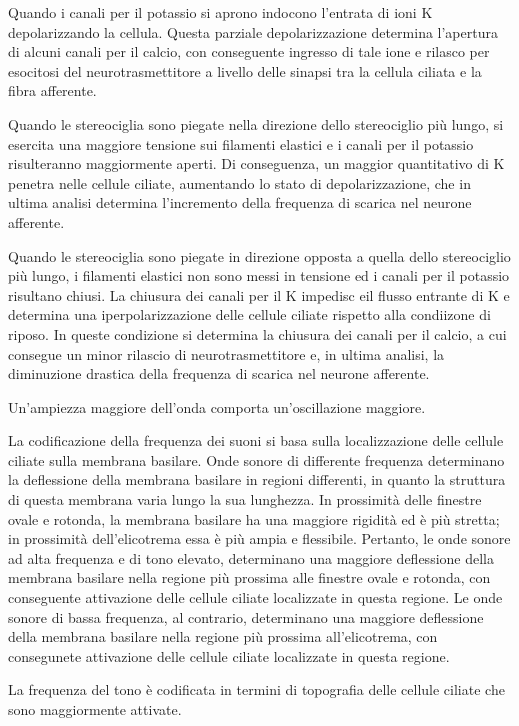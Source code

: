 \documentclass[]{article}
\begin{document}
Quando i canali per il potassio si aprono indocono l'entrata di ioni K
depolarizzando la cellula. Questa parziale depolarizzazione determina
l'apertura di alcuni canali per il calcio, con conseguente ingresso di
tale ione e rilasco per esocitosi del neurotrasmettitore a livello delle
sinapsi tra la cellula ciliata e la fibra afferente.

Quando le stereociglia sono piegate nella direzione dello stereociglio
più lungo, si esercita una maggiore tensione sui filamenti elastici e i
canali per il potassio risulteranno maggiormente aperti. Di conseguenza,
un maggior quantitativo di K penetra nelle cellule ciliate, aumentando
lo stato di depolarizzazione, che in ultima analisi determina
l'incremento della frequenza di scarica nel neurone afferente.

Quando le stereociglia sono piegate in direzione opposta a quella dello
stereociglio più lungo, i filamenti elastici non sono messi in tensione
ed i canali per il potassio risultano chiusi. La chiusura dei canali per
il K impedisc eil flusso entrante di K e determina una
iperpolarizzazione delle cellule ciliate rispetto alla condiizone di
riposo. In queste condizione si determina la chiusura dei canali per il
calcio, a cui consegue un minor rilascio di neurotrasmettitore e, in
ultima analisi, la diminuzione drastica della frequenza di scarica nel
neurone afferente.

Un'ampiezza maggiore dell'onda comporta un'oscillazione maggiore.

La codificazione della frequenza dei suoni si basa sulla localizzazione
delle cellule ciliate sulla membrana basilare. Onde sonore di differente
frequenza determinano la deflessione della membrana basilare in regioni
differenti, in quanto la struttura di questa membrana varia lungo la sua
lunghezza. In prossimità delle finestre ovale e rotonda, la membrana
basilare ha una maggiore rigidità ed è più stretta; in prossimità
dell'elicotrema essa è più ampia e flessibile. Pertanto, le onde sonore
ad alta frequenza e di tono elevato, determinano una maggiore
deflessione della membrana basilare nella regione più prossima alle
finestre ovale e rotonda, con conseguente attivazione delle cellule
ciliate localizzate in questa regione. Le onde sonore di bassa
frequenza, al contrario, determinano una maggiore deflessione della
membrana basilare nella regione più prossima all'elicotrema, con
consegunete attivazione delle cellule ciliate localizzate in questa
regione.

La frequenza del tono è codificata in termini di topografia delle
cellule ciliate che sono maggiormente attivate.
\end{document}
